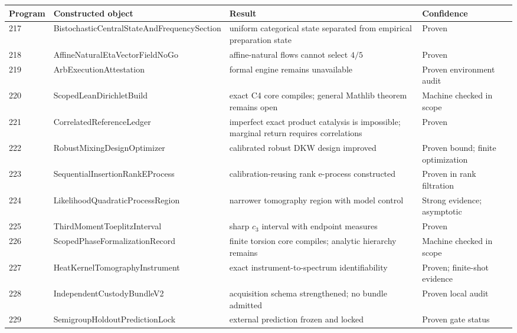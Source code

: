 \documentclass[11pt,a4paper,openany]{report}
\begin{document}
\begin{center}
\begingroup\small
\setlength{\tabcolsep}{3.5pt}
\renewcommand{\arraystretch}{1.16}
\begin{longtable}{@{}p{}p{}p{}p{}@{}}
\toprule
\textbf{Program} & \textbf{Constructed object} & \textbf{Result} & \textbf{Confidence} \\
\midrule
\endhead
217 & BistochasticCentralStateAndFrequencySection & uniform categorical state separated from empirical preparation state & Proven \\
218 & AffineNaturalEtaVectorFieldNoGo & affine-natural flows cannot select \(4/5\) & Proven \\
219 & ArbExecutionAttestation & formal engine remains unavailable & Proven environment audit \\
220 & ScopedLeanDirichletBuild & exact C4 core compiles; general Mathlib theorem remains open & Machine checked in scope \\
221 & CorrelatedReferenceLedger & imperfect exact product catalysis is impossible; marginal return requires correlations & Proven \\
222 & RobustMixingDesignOptimizer & calibrated robust DKW design improved & Proven bound; finite optimization \\
223 & SequentialInsertionRankEProcess & calibration-reusing rank e-process constructed & Proven in rank filtration \\
224 & LikelihoodQuadraticProcessRegion & narrower tomography region with model control & Strong evidence; asymptotic \\
225 & ThirdMomentToeplitzInterval & sharp \(c_3\) interval with endpoint measures & Proven \\
226 & ScopedPhaseFormalizationRecord & finite torsion core compiles; analytic hierarchy remains & Machine checked in scope \\
227 & HeatKernelTomographyInstrument & exact instrument-to-spectrum identifiability & Proven; finite-shot evidence \\
228 & IndependentCustodyBundleV2 & acquisition schema strengthened; no bundle admitted & Proven local audit \\
229 & SemigroupHoldoutPredictionLock & external prediction frozen and locked & Proven gate status \\
\bottomrule
\end{longtable}
\endgroup
\end{center}
\end{document}
